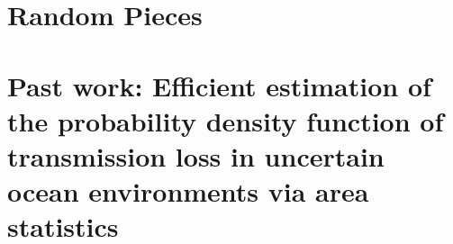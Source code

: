 \documentclass{./tex/thesis-umich}
\begin{document}
\appendix
\begin{appendices}
  \chapter{Random Pieces}
  
  
  
  
  


  \chapter{Past work: Efficient estimation of the probability density
    function of transmission loss in uncertain ocean environments via
    area statistics}
  
  
  
  
  
\end{appendices}




\end{document}
